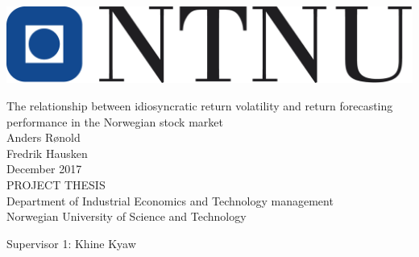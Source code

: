 \thispagestyle{empty}
\includegraphics[scale=0.4]{Pictures/ntnu.png}
\mbox{}\\[6pc]
\begin{center}
\Huge{The relationship between idiosyncratic return volatility and return forecasting performance in the Norwegian stock market}\\[2pc]

\Large{Anders Rønold \\ Fredrik Hausken}\\[1pc]
\large{December 2017}\\[2pc]

PROJECT THESIS\\
Department of Industrial Economics and Technology management\\
Norwegian University of Science and Technology
\end{center}
\vfill

\noindent Supervisor 1: Khine Kyaw


